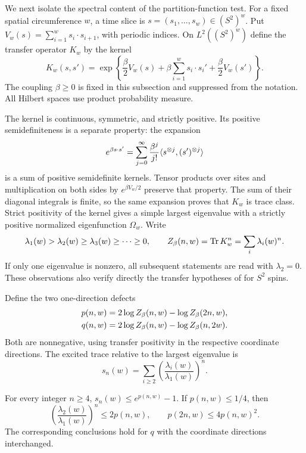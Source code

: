 We next isolate the spectral content of the partition-function test.
For a fixed spatial circumference $w$, a time slice is
$s=(s_1,\ldots,s_w)\in(S^2)^w$.  Put
$V_w(s)=\sum_{i=1}^w s_i\cdot s_{i+1}$, with periodic indices.
On $L^2((S^2)^w)$ define the transfer operator $K_w$ by the kernel
\begin{equation}
 K_w(s,s')=
 \exp\left\{\frac\beta2V_w(s)
       +\beta\sum_{i=1}^w s_i\cdot s_i'
       +\frac\beta2V_w(s')\right\}.
 \label{eq:trace-kernel}
\end{equation}
The coupling $\beta\ge0$ is fixed in this subsection and suppressed
from the notation.  All Hilbert spaces use product probability measure.

The kernel is continuous, symmetric, and strictly positive.  Its
positive semidefiniteness is a separate property: the expansion
\[
 e^{\beta s\cdot s'}
   =\sum_{j=0}^{\infty}\frac{\beta^j}{j!}
       \langle s^{\otimes j},(s')^{\otimes j}\rangle
\]
is a sum of positive semidefinite kernels.  Tensor products over sites
and multiplication on both sides by $e^{\beta V_w/2}$ preserve that
property.  The sum of their diagonal integrals is finite, so the same
expansion proves that $K_w$ is trace class.  Strict positivity of the
kernel gives a simple largest eigenvalue with a strictly positive
normalized eigenfunction $\Omega_w$.  Write
\[
 \lambda_1(w)>\lambda_2(w)\ge\lambda_3(w)\ge\cdots\ge0,
 \qquad
 Z_\beta(n,w)=\operatorname{Tr} K_w^n=\sum_i\lambda_i(w)^n.
\]
If only one eigenvalue is nonzero, all subsequent statements are read
with $\lambda_2=0$.  These observations also verify directly the
transfer hypotheses of  for $S^2$ spins.

Define the two one-direction defects
\begin{align}
 p(n,w)&=2\log Z_\beta(n,w)-\log Z_\beta(2n,w),\notag\\
 q(n,w)&=2\log Z_\beta(n,w)-\log Z_\beta(n,2w).
 \label{eq:trace-one-direction}
\end{align}
Both are nonnegative, using transfer positivity in the respective
coordinate directions.  The excited trace relative to the largest
eigenvalue is
\[
 s_n(w)=\sum_{i\ge2}
       \left(\frac{\lambda_i(w)}{\lambda_1(w)}\right)^n.
\]

\begin{lemma}
\label{lem:trace-concentration}
For every integer $n\ge4$,
$s_n(w)\le e^{p(n,w)}-1$.  If $p(n,w)\le1/4$, then
\begin{equation}
 \left(\frac{\lambda_2(w)}{\lambda_1(w)}\right)^n
       \le2p(n,w),\qquad
 p(2n,w)\le4p(n,w)^2.
 \label{eq:trace-squaring}
\end{equation}
The corresponding conclusions hold for $q$ with the coordinate
directions interchanged.
\end{lemma}

